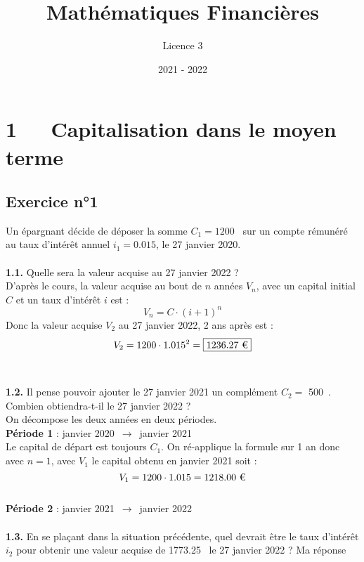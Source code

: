 \documentclass{article}
\title{Mathématiques Financières}
\author{Licence 3}
\date{2021 - 2022}
\begin{document}
\normalsize
\maketitle

\renewcommand*\contentsname{Table des matières}
\newpage

\section{1   Capitalisation dans le moyen terme}
\subsection{Exercice n°1}
\textcolor{exogris}{
Un épargnant décide de déposer la somme $C_1 = 1200$ \texteuro sur un compte rémunéré au taux d’intérêt annuel $i_1 = 0.015$, le 27 janvier 2020.
}
\\\\ \textcolor{exogris}{\textbf{1.1.}
Quelle sera la valeur acquise au 27 janvier 2022 ?
}
\\%
D'après le cours, la valeur acquise au bout de $n$ années $V_n$, avec un capital initial $C$ et un taux d'intérêt $i$ est :
$$V_n = C\cdot(i+1)^n$$
Donc la valeur acquise $V_2$ au 27 janvier 2022, 2 ans après est :
$$V_2 = 1200 \cdot 1.015^2 = \boxed{1236.27 \text{ \texteuro}}$$
\\%
\\%
\textcolor{exogris}{\textbf{1.2.}
Il pense pouvoir ajouter le 27 janvier 2021 un complément $C_2 =$ 500 \texteuro. Combien obtiendra-t-il le 27 janvier 2022 ?
}
\\%
On décompose les deux années en deux périodes.
\\\textbf{Période 1} : janvier 2020 $\rightarrow$ janvier 2021
\\Le capital de départ est toujours $C_1$. On ré-applique la formule sur 1 an donc avec $n=1$, avec $V_1$ le capital obtenu en janvier 2021 soit :
$$V_1 = 1200 \cdot 1.015 = 1218.00 \text{ \texteuro}$$
\\\textbf{Période 2} : janvier 2021 $\rightarrow$ janvier 2022
\\%
\\%
\textcolor{exogris}{\textbf{1.3.}
En se plaçant dans la situation précédente, quel devrait être le taux d’intérêt $i_2$ pour obtenir une valeur
acquise de 1773.25 \texteuro le 27 janvier 2022 ?
}%
Ma réponse


\end{document}
